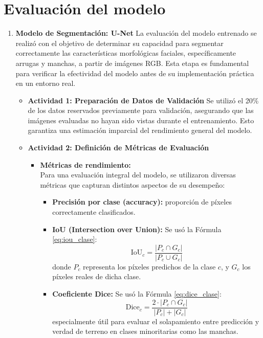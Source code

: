 \section{Evaluación del modelo}

\begin{enumerate}
  \item \textbf{Modelo de Segmentación: U-Net}
  La evaluación del modelo entrenado se realizó con el objetivo de determinar su capacidad para segmentar correctamente las características morfológicas faciales, específicamente arrugas y manchas, a partir de imágenes RGB. Esta etapa es fundamental para verificar la efectividad del modelo antes de su implementación práctica en un entorno real.

  \begin{itemize}
  \item\textbf{Actividad 1: Preparación de Datos de Validación}
  Se utilizó el 20\% de los datos reservados previamente para validación, asegurando que las imágenes evaluadas no hayan sido vistas durante el entrenamiento. Esto garantiza una estimación imparcial del rendimiento general del modelo.

  \item\textbf{Actividad 2: Definición de Métricas de Evaluación}
  \begin{itemize}
  
  
    \item \textbf{Métricas de rendimiento:}\\
    Para una evaluación integral del modelo, se utilizaron diversas métricas que capturan distintos aspectos de su desempeño:
    \begin{itemize}
      \item \textbf{Precisión por clase (accuracy):} proporción de píxeles correctamente clasificados.
      \item \textbf{IoU (Intersection over Union):}
      Se usó la Fórmula \ref{eq:iou_clase}:
      \begin{equation}\label{eq:iou_clase}
        \text{IoU}_c = \frac{|P_c \cap G_c|}{|P_c \cup G_c|}
    \end{equation}
      donde $P_c$ representa los píxeles predichos de la clase $c$, y $G_c$ los píxeles reales de dicha clase.
  
      \item \textbf{Coeficiente Dice:}
      Se usó la Fórmula \ref{eq:dice_clase}:
      \begin{equation}\label{eq:dice_clase}
        \text{Dice}_c = \frac{2 \cdot |P_c \cap G_c|}{|P_c| + |G_c|}
    \end{equation}
      especialmente útil para evaluar el solapamiento entre predicción y verdad de terreno en clases minoritarias como las manchas.
  

\end{itemize}
\end{itemize}
\end{itemize}
\end{enumerate}

